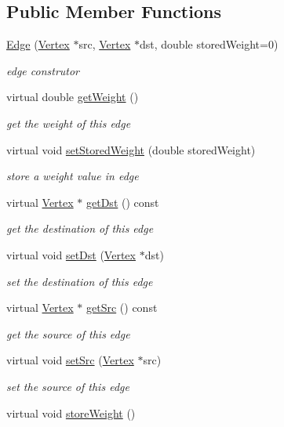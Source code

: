 \subsection*{Public Member Functions}
\begin{DoxyCompactItemize}
\item 
\hyperlink{class_edge_a175c30ff76609608a96c498c13ef55b0}{Edge} (\hyperlink{class_vertex}{Vertex} $\ast$src, \hyperlink{class_vertex}{Vertex} $\ast$dst, double stored\+Weight=0)
\begin{DoxyCompactList}\small\item\em edge construtor \end{DoxyCompactList}\item 
virtual double \hyperlink{class_edge_a3a776c1ccafacdbdb10fdedd9cb329af}{get\+Weight} ()
\begin{DoxyCompactList}\small\item\em get the weight of this edge \end{DoxyCompactList}\item 
virtual void \hyperlink{class_edge_af7851a1bcd26d69b03010c85ae26be4d}{set\+Stored\+Weight} (double stored\+Weight)
\begin{DoxyCompactList}\small\item\em store a weight value in edge \end{DoxyCompactList}\item 
virtual \hyperlink{class_vertex}{Vertex} $\ast$ \hyperlink{class_edge_ac8602ef0c7762e086a719e5c300e80b8}{get\+Dst} () const 
\begin{DoxyCompactList}\small\item\em get the destination of this edge \end{DoxyCompactList}\item 
virtual void \hyperlink{class_edge_a43d8bf7d905ff0a4df84b2634e8e9860}{set\+Dst} (\hyperlink{class_vertex}{Vertex} $\ast$dst)
\begin{DoxyCompactList}\small\item\em set the destination of this edge \end{DoxyCompactList}\item 
virtual \hyperlink{class_vertex}{Vertex} $\ast$ \hyperlink{class_edge_a9942c08298b9abcdd39918c1e723ab6a}{get\+Src} () const 
\begin{DoxyCompactList}\small\item\em get the source of this edge \end{DoxyCompactList}\item 
virtual void \hyperlink{class_edge_af48131d832408a09b41ce0b39361c2ab}{set\+Src} (\hyperlink{class_vertex}{Vertex} $\ast$src)
\begin{DoxyCompactList}\small\item\em set the source of this edge \end{DoxyCompactList}\item 
\hypertarget{class_edge_afe6e80534a1f9805d2e8730d0d4d5cc7}{}virtual void \hyperlink{class_edge_afe6e80534a1f9805d2e8730d0d4d5cc7}{store\+Weight} ()\label{class_edge_afe6e80534a1f9805d2e8730d0d4d5cc7}


\end{DoxyCompactItemize}
